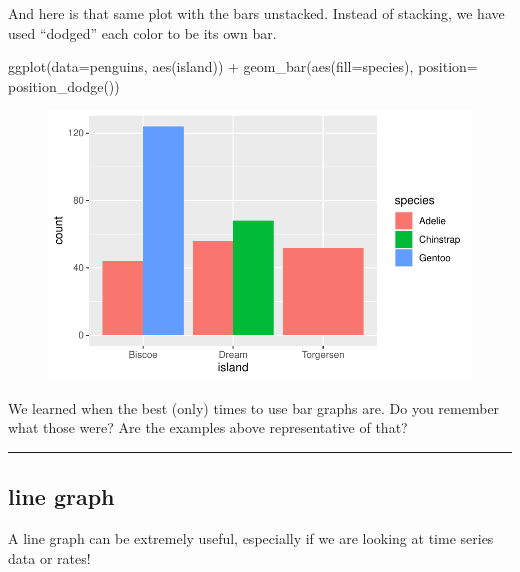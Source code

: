 \documentclass[
  letterpaper,
  DIV=11,
  numbers=noendperiod]{scrartcl}
\newenvironment{Shaded}{\begin{snugshade}}{\end{snugshade}}
\newcommand{\AttributeTok}[1]{\textcolor[rgb]{0.40,0.45,0.13}{#1}}
\newcommand{\FunctionTok}[1]{\textcolor[rgb]{0.28,0.35,0.67}{#1}}
\newcommand{\NormalTok}[1]{\textcolor[rgb]{0.00,0.23,0.31}{#1}}
\newcommand{\SpecialCharTok}[1]{\textcolor[rgb]{0.37,0.37,0.37}{#1}}
\begin{document}
And here is that same plot with the bars unstacked. Instead of stacking,
we have used ``dodged'' each color to be its own bar.

\begin{Shaded}
\begin{Highlighting}[]
\FunctionTok{ggplot}\NormalTok{(}\AttributeTok{data=}\NormalTok{penguins, }\FunctionTok{aes}\NormalTok{(island)) }\SpecialCharTok{+}
  \FunctionTok{geom\_bar}\NormalTok{(}\FunctionTok{aes}\NormalTok{(}\AttributeTok{fill=}\NormalTok{species), }\AttributeTok{position=} \FunctionTok{position\_dodge}\NormalTok{())}
\end{Highlighting}
\end{Shaded}

\begin{figure}[H]

{\centering \includegraphics{basic_graphs_files/figure-pdf/unnamed-chunk-12-1.pdf}

}

\end{figure}

We learned when the best (only) times to use bar graphs are. Do you
remember what those were? Are the examples above representative of that?

\begin{center}\rule{0.5\linewidth}{0.5pt}\end{center}

\subsection{\texorpdfstring{\textbf{line graph}}{line graph}}

A line graph can be extremely useful, especially if we are looking at
time series data or rates!
\end{document}
